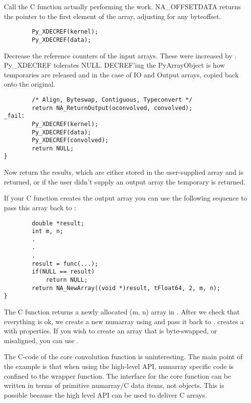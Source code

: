 Call the C function actually performing the work.  NA_OFFSETDATA returns the
pointer to the first element of the array,  adjusting for any byteoffset.

\begin{verbatim}
        Py_XDECREF(kernel);
        Py_XDECREF(data);
\end{verbatim}

Decrease the reference counters of the input arrays.  These were increased by
.  Py_XDECREF tolerates NULL.  DECREF'ing the
PyArrayObject is how temporaries are released and in the case of
IO and Output arrays, copied back onto the original.

\begin{verbatim}
        /* Align, Byteswap, Contiguous, Typeconvert */
        return NA_ReturnOutput(oconvolved, convolved);
_fail:
        Py_XDECREF(kernel);
        Py_XDECREF(data);
        Py_XDECREF(convolved);
        return NULL;
}
\end{verbatim}

Now return the results, which are either stored in the user-supplied array
 and  is returned, or if the user didn't
supply an output array the temporary  is returned.

If your C function creates the output array you can use the following sequence
to pass this array back to \python{}:

\begin{verbatim}
        double *result;
        int m, n;
        .
        .
        .
        result = func(...);
        if(NULL == result)
            return NULL;
        return NA_NewArray((void *)result, tFloat64, 2, m, n);
}
\end{verbatim}

The C function  returns a newly allocated (m, n) array in
.  After we check that everything is ok, we create a new numarray
using  and pass it back to \python.  
creates a  with  properties.  If you wish to
create an array that is byte-swapped, or misaligned, you can use
.

The C-code of the core convolution function is uninteresting.  The main point
of the example is that when using the high-level API, numarray specific code is
confined to the wrapper function.  The interface for the core function can be
written in terms of primitive numarray/C data items, not objects.  This is
possible because the high level API can be used to deliver C arrays.

